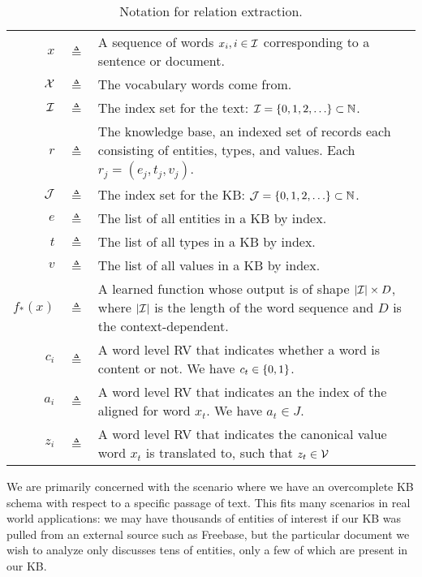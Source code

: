 \documentclass[12pt]{article}
\begin{document}
\begin{table}[htbp]\caption{Notation for relation extraction.}
\centering %
\begin{tabular}{r c p{10cm}}
\toprule
$x$ & $\triangleq$ & A sequence of words $x_i, i \in \mathcal{I}$
    corresponding to a sentence or document.\\
$\mathcal{X}$ & $\triangleq$ & The vocabulary words come from.\\
$\mathcal{I}$ & $\triangleq$ & The index set for the text:
    $\mathcal{I} = \left\{0,1,2,\ldots\right\}\subset \mathbb{N}$.\\
\midrule
$r$ & $\triangleq$ & The knowledge base,
    an indexed set of records each consisting of entities, types, and values.
    Each $r_j = (e_j, t_j, v_j)$.\\
$\mathcal{J}$ & $\triangleq$ & The index set for the KB:
    $\mathcal{J} = \left\{0,1,2,\ldots\right\}\subset \mathbb{N}$.\\
$e$ & $\triangleq$ & The list of all entities in a KB by index.\\
$t$ & $\triangleq$ & The list of all types in a KB by index.\\
$v$ & $\triangleq$ & The list of all values in a KB by index.\\
\midrule
$f_*(x)$ & $\triangleq$ & A learned function whose output is of shape $|\mathcal{I}| \times D$,
    where $|\mathcal{I}|$ is the length of the word sequence and $D$ is the context-dependent.\\
$c_i$ & $\triangleq$ & A word level RV that indicates whether a word is content or not.
    We have $c_t \in \left\{0,1\right\}$.\\
$a_i$ & $\triangleq$ & A word level RV that indicates an the index of the aligned
    for word $x_t$. We have $a_t \in J$.\\
$z_i$ & $\triangleq$ & A word level RV that indicates the canonical value 
word $x_t$ is translated to, such that $z_t \in \mathcal{V}$\\
\bottomrule
\end{tabular}
\label{tab:TableOfNotationForMyResearch}
\end{table}

We are primarily concerned with the scenario where we have an overcomplete KB schema with
respect to a specific passage of text.
This fits many scenarios in real world applications:
we may have thousands of entities of interest if our KB was pulled from an 
external source such as Freebase,
but the particular document we wish to analyze only discusses tens of entities,
only a few of which are present in our KB.
\end{document}
